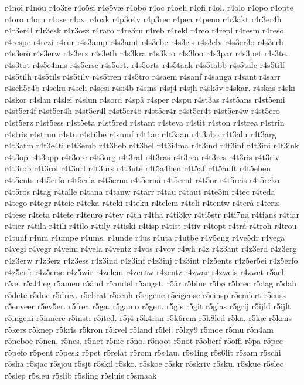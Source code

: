 {{r4noi
r4nou
r4o3re
r4o5si
r4ø5væ
r4obo
r4oc
r4oeh
r4ofi
r4ol.
r4olo
r4opo
r4opte
r4oro
r4oru
r4ose
r4ox.
r4oxk
r4p3o4v
r4p3rec
r4pea
r4peno
r4r3akt
r4r3er4h
r4r3er4l
r4r3esk
r4r3osz
r4raro
r4re3ru
r4reb
r4rekl
r4reo
r4repl
r4resm
r4reso
r4respe
r4rezi
r4rur
r4s3amp
r4s3amt
r4s3ebe
r4s3eis
r4s3elv
r4s3er3o
r4s3erh
r4s3erö
r4s3erw
r4s3erz
r4s3eth
r4s3kra
r4s3kro
r4s3loo
r4s3par
r4s3pet
r4s3te.
r4s3tot
r4s5e4mis
r4s5ersc
r4s5ort.
r4s5orts
r4s5taak
r4s5tabb
r4s5tale
r4s5tilf
r4s5tilh
r4s5tils
r4s5tilv
r4s5tren
r4s5tro
r4saem
r4sanf
r4sanga
r4sant
r4sarr
r4sch5e4b
r4seku
r4seli
r4sesi
r4si4b
r4sins
r4sj4
r4sjh
r4sk5v
r4skar.
r4skas
r4ski
r4skor
r4slan
r4slei
r4slun
r4sord
r4spå
r4sper
r4spu
r4st3as
r4st5ans
r4st5emi
r4st5er4f
r4st5er4h
r4st5er4l
r4st5er4ö
r4st5er4r
r4st5er4t
r4st5er4w
r4st5ero
r4st5erz
r4st5ess
r4st5eta
r4st5red
r4stant
r4steva
r4stit
r4ston
r4strea
r4strin
r4stris
r4strun
r4stu
r4stübe
r4sumf
r4t1ac
r4t3aan
r4t3abo
r4t3alu
r4t3arg
r4t3atm
r4t3e4ti
r4t3emb
r4t3heb
r4t3hel
r4t3i4ma
r4t3ind
r4t3inf
r4t3ini
r4t3ink
r4t3op
r4t3opp
r4t3orc
r4t3org
r4t3ral
r4t3ras
r4t3rea
r4t3res
r4t3ris
r4t3riv
r4t3rob
r4t3rol
r4t3url
r4t3urs
r4t3ute
r4t5a4ben
r4t5af
r4t5auft
r4t5eben
r4t5ents
r4t5erfo
r4t5erla
r4t5erna
r4t5ernä
r4t5ernt
r4t5or
r4t5reis
r4t5reko
r4t5ros
r4tag
r4talle
r4tana
r4tanw
r4tarr
r4tau
r4taut
r4te3in
r4tec
r4teda
r4tego
r4tegr
r4teie
r4teka
r4teki
r4teku
r4telem
r4teli
r4tentw
r4terå
r4teris
r4tese
r4teta
r4tete
r4teuro
r4tev
r4th
r4tha
r4ti3kv
r4ti5str
r4ti7na
r4tians
r4tiar
r4tier
r4tila
r4tili
r4tilo
r4tily
r4tiski
r4tisp
r4tist
r4tiv
r4topt
r4trá
r4troh
r4trou
r4tunf
r4um
r4umpe
r4ums.
r4unde
r4us
r4uta
r4utbe
r4v5eng
r4ve5dr
r4vega
r4vegi
r4vegr
r4veim
r4vela
r4ventz
r4vos
r4vov
r4wh
r4z
r4z3ant
r4z3erd
r4z3erg
r4z3erw
r4z3erz
r4z3ess
r4z3ind
r4z3inf
r4z3inj
r4z3int
r4z5ents
r4z5er5ei
r4z5erfo
r4z5erfr
r4z5ersc
r4z5wir
r4zelem
r4zentw
r4zentz
r4zwar
r4zweis
r4zwet
r5acl
r5æl
r5al4leg
r5ameu
r5ånd
r5andel
r5angst.
r5år
r5bine
r5bø
r5brec
r5dag
r5dah
r5dete
r5doc
r5drev.
r5ebrat
r5eenh
r5eigene
r5eigensc
r5einsp
r5endert
r5enss
r5enveer
r5ev5er.
r5frea
r5ga.
r5gamo
r5gen.
r5gis
r5git
r5glas
r5grij
r5ijld
r5ijlt
r5ingeni
r5innere
r5insti
r5ited.
r5j4
r5k4ran
r5k6rem
r5k8led
r5ka.
r5kæ
r5kens
r5kers
r5knep
r5kris
r5kron
r5kvel
r5land
r5lei.
r5løy9
r5moe
r5mu
r5n4am
r5neboe
r5nen.
r5nes.
r5net
r5nic
r5no.
r5noot
r5not
r5oberf
r5offi
r5pa
r5pee
r5pefo
r5pent
r5pesk
r5pet
r5relat
r5rom
r5s4au.
r5s4ing
r5s6lit
r5sam
r5schi
r5sha
r5sjac
r5sjou
r5sjt
r5skil
r5sko.
r5skoe
r5skr
r5skriv
r5sku.
r5skue
r5slec
r5slep
r5sleu
r5slib
r5sling
r5sluis
r5smaak
}}

